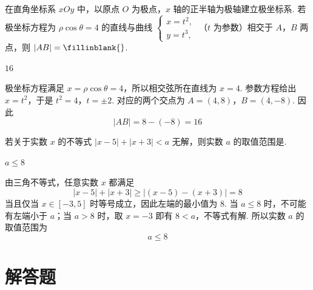\begin{problem}
在直角坐标系 \(xOy\) 中，以原点 \(O\) 为极点，\(x\) 轴的正半轴为极轴建立极坐标系. 若极坐标方程为 \(\rho\cos \theta = 4\) 的直线与曲线 \(\begin{cases}
x = t^2,\\
y = t^3,
\end{cases}\) （\(t\) 为参数）相交于 \(A\)，\(B\) 两点，则 \(|AB| =\fillinblank{}\).

\begin{answer}
\(16\)
\end{answer}

\begin{solution}
极坐标方程满足 \(x=\rho\cos\theta=4\)，所以相交弦所在直线为 \(x=4\). 参数方程给出 \(x=t^2\)，于是
\(t^2=4\)，\(t=\pm2\).
对应的两个交点为
\(A=(4,8)\)，\(B=(4,-8)\).
因此
\[
|AB|=8-(-8)=16
\]
\end{solution}
\end{problem}

\begin{problem}
若关于实数 \(x\) 的不等式 \(|x - 5| + |x + 3| < a\) 无解，则实数 \(a\) 的取值范围是\fillinblank{}.

\begin{answer}
\(a \leqslant 8\)
\end{answer}

\begin{solution}
由三角不等式，任意实数 \(x\) 都满足
\[
|x-5|+|x+3|\geqslant\left|(x-5)-(x+3)\right|=8
\]
当且仅当 \(x\in[-3,5]\) 时等号成立，因此左端的最小值为 \(8\). 当 \(a\leqslant8\) 时，不可能有左端小于 \(a\)；当 \(a>8\) 时，取 \(x=-3\) 即有 \(8<a\)，不等式有解.
所以实数 \(a\) 的取值范围为
\[
a\leqslant8
\]
\end{solution}
\end{problem}

\section{解答题}

